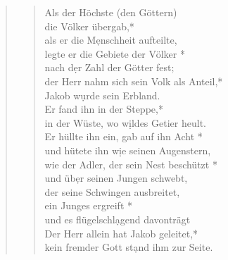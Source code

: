 \begin{quote}
\begin{verse}
\vspace{0.3cm}

\vspace{0.3cm}

Als der Höchste (den Göttern) \\ die Völker übergab,*\\
als er die M\d enschheit aufteilte,\\
\vin legte er die Gebiete der Völker *\\
\vin nach d\d er Zahl der Götter fest;\\
der Herr nahm sich sein Volk als Anteil,*\\
Jakob w\d urde sein Erbland.\\
\vin Er fand ihn in der Steppe,*\\
\vin in der Wüste, wo w\d ildes Getier heult.\\
Er hüllte ihn ein, gab auf ihn Acht *\\
und hütete ihn w\d ie seinen Augenstern,\\
\vin wie der Adler, der sein Nest beschützt *\\
\vin und üb\d er seinen Jungen schwebt,\\
der seine Schwingen ausbreitet, \\ein Junges ergreift *\\
und es flügelschl\d agend davonträgt\\
\vin Der Herr allein hat Jakob geleitet,*\\
\vin kein fremder Gott st\d and ihm zur Seite.\\

 
\end{verse}
\end{quote}
\vspace{0.3cm}

\def\greinitialformat#1{{\fontsize{40}{40}\selectfont #1}}
\gresetfirstlineaboveinitial{\small \textcolor{red}{Ps 150}}{}
\setaboveinitialseparation{0.72mm}


\vspace{0.3cm}

